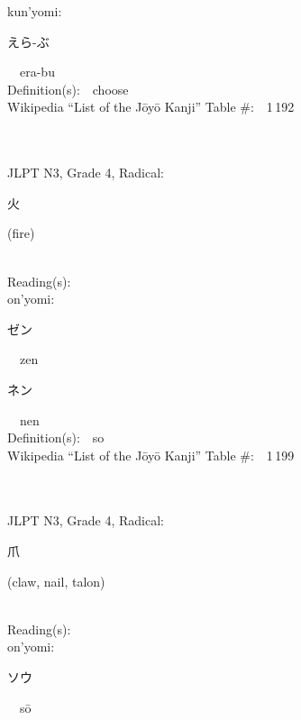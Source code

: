\begin{multicols}{2}
{\hspace*{1em}}kun'yomi:\ \ \\
{\hspace*{2em}}{\begin{CJK}{UTF8}{min} えら-ぶ \end{CJK}}\ \ era-bu\ \ \\
Definition(s):\ \ choose \\
Wikipedia ``List of the J\=oy\=o Kanji'' Table \#:\ \ 1\,192 \\
\ \ \\
{\fontsize{34pt}{40pt}  }\ \ \\  %
{JLPT N3, Grade 4, Radical:\ \ {\begin{CJK}{UTF8}{min} 火 \end{CJK}} (fire) } \\
Reading(s):\ \ \\
{\hspace*{1em}}on'yomi:\ \ \\
{\hspace*{2em}}{\begin{CJK}{UTF8}{min} ゼン \end{CJK}}\ \ zen\ \ \\
{\hspace*{2em}}{\begin{CJK}{UTF8}{min} ネン \end{CJK}}\ \ nen\ \ \\
Definition(s):\ \ so \\
Wikipedia ``List of the J\=oy\=o Kanji'' Table \#:\ \ 1\,199 \\
\ \ \\
{\fontsize{34pt}{40pt}  }\ \ \\  %
{JLPT N3, Grade 4, Radical:\ \ {\begin{CJK}{UTF8}{min} 爪 \end{CJK}} (claw, nail, talon) } \\
Reading(s):\ \ \\
{\hspace*{1em}}on'yomi:\ \ \\
{\hspace*{2em}}{\begin{CJK}{UTF8}{min} ソウ \end{CJK}}\ \ s\=o\ \ \\

\end{multicols}
